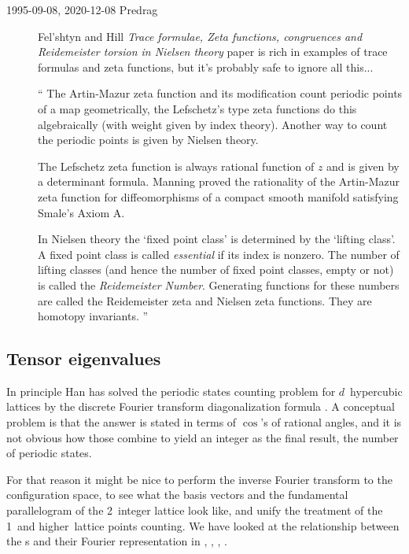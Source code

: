 \begin{description}
\item[1995-09-08, 2020-12-08 Predrag]
Fel{'s}htyn and Hill {\em Trace formulae, {Zeta} functions,
congruences and {Reidemeister} torsion in {Nielsen} theory}
 paper is rich in examples of trace formulas and
zeta functions, but it's probably safe to ignore all this...

``
The Artin-Mazur zeta function and its modification count periodic points
of a map geometrically, the Lefschetz's type zeta functions do this
algebraically (with weight given by index theory). Another way to count the
periodic points is given by Nielsen theory.

The Lefschetz zeta function is always rational function of $z$ and is given by
a determinant formula. Manning proved the rationality of the
Artin-Mazur zeta function for diffeomorphisms of a compact smooth manifold
satisfying Smale's Axiom A.

In Nielsen theory the `fixed point class' is determined by the `lifting
class'. A fixed point class is called \emph{essential} if its index is
nonzero. The number of lifting classes (and hence the number of fixed
point classes, empty or not) is called the \emph{Reidemeister Number}.
Generating functions for these numbers are called the Reidemeister zeta
and Nielsen zeta functions. They are homotopy invariants.
''

\end{description}


\subsection{Tensor eigenvalues}

In principle Han has solved the periodic states counting problem for
$d$\dmn\ hypercubic lattices by the discrete Fourier transform
diagonalization formula . A conceptual problem is
that the answer is stated in terms of $\cos$'s of rational angles, and it
is not obvious how those combine to yield an integer as the final result,
the number of periodic states.

For that reason it might be nice to perform the inverse Fourier transform
to the configuration space, to see what the basis vectors and the
fundamental parallelogram of the 2\dmn\ integer lattice look like, and
unify the treatment of the 1\dmn\ and higher\dmn\ lattice points
counting. We have looked at the relationship between the {\lattstate}s
and their Fourier representation in ,
,
, \etc.

